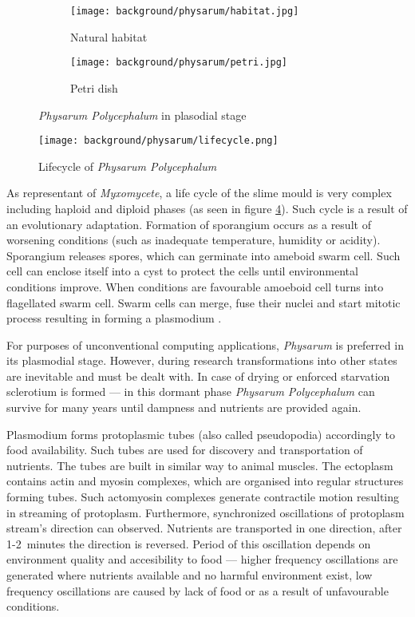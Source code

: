 \begin{figure}
  \centering
  \begin{subfigure}{0.45\textwidth}
    \centering
    \texttt{[image: background/physarum/habitat.jpg]}
    \caption{Natural habitat \cite{TODO}}
    \label{figure:bp_habitat}
  \end{subfigure}
  \begin{subfigure}{0.45\textwidth}
    \centering
    \texttt{[image: background/physarum/petri.jpg]}
    \caption{Petri dish}
    \label{figure:bp_petri}
  \end{subfigure}
  \caption{\textit{Physarum Polycephalum} in plasodial stage}
\end{figure}

\begin{figure}
  \centering
  \texttt{[image: background/physarum/lifecycle.png]}
  \caption{Lifecycle of \textit{Physarum Polycephalum} \cite{TODO}}
  \label{figure:bp_lifecycle}
\end{figure}

As representant of \textit{Myxomycete}, a life cycle of the slime mould is very complex including haploid and diploid phases (as seen in figure \ref{figure:bp_lifecycle}). Such cycle is a result of an evolutionary adaptation. Formation of sporangium occurs as a result of worsening conditions (such as inadequate temperature, humidity or acidity). Sporangium releases spores, which can germinate into ameboid swarm cell. Such cell can enclose itself into a cyst to protect the cells until environmental conditions improve. When conditions are favourable amoeboid cell turns into flagellated swarm cell. Swarm cells can merge, fuse their nuclei and start mitotic process resulting in forming a plasmodium \cite{jones2015pattern}.

For purposes of unconventional computing applications, \textit{Physarum} is preferred in its plasmodial stage. However, during research transformations into other states are inevitable and must be dealt with. In case of drying or enforced starvation sclerotium is formed --- in this dormant phase \textit{Physarum Polycephalum} can survive for many years until dampness and nutrients are provided again.

Plasmodium forms protoplasmic tubes (also called pseudopodia) accordingly to food availability. Such tubes are used for discovery and transportation of nutrients. The tubes are built in similar way to animal muscles. The ectoplasm contains actin and myosin complexes, which are organised into regular structures forming tubes. Such actomyosin complexes generate contractile motion resulting in streaming of protoplasm. Furthermore, synchronized oscillations of protoplasm stream's direction can observed. Nutrients are transported in one direction, after 1-2~minutes the direction is reversed. Period of this oscillation depends on environment quality and accesibility to food \cite{wohlfarth1979oscillatory} --- higher frequency oscillations are generated where nutrients available and no harmful environment exist, low frequency oscillations are caused by lack of food or as a result of unfavourable conditions. 

